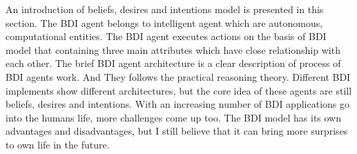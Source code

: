 An introduction of beliefs, desires and intentions model is presented in this section. The BDI agent belongs to intelligent agent which are autonomous, computational entities. The BDI agent executes actions on the basis of BDI model that containing three main attributes which have close relationship with each other. The brief BDI agent architecture is a clear description of process of BDI agents work. And They follows the practical reasoning theory. Different BDI implements show different architectures, but the core idea of these agents are still beliefs, desires and intentions. With an increasing number of BDI applications go into the humans life, more challenges come up too. The BDI model has its own advantages and disadvantages, but I still believe that it can bring more surprises to own life in the future.



